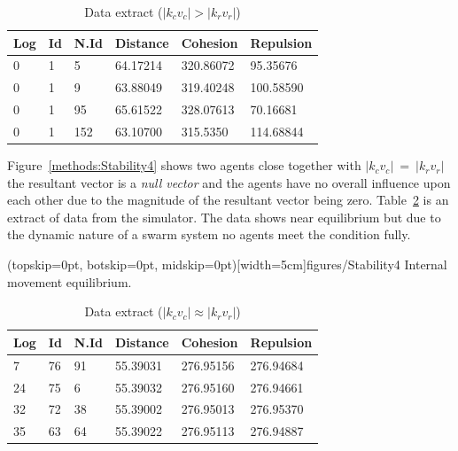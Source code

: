 \documentclass{ieeeaccess}
\begin{document}
\begin{table}[H]
\begin{center}
\begin{tabular}{| l | l | l | l | l | l |}
\hline
Log &	Id &	N.Id &	Distance &	{\color{green}Cohesion} & {\color{red}Repulsion} 	\\ \hline
0 & 1 & 5 &	64.17214 &	{\color{green}320.86072} &	{\color{red}95.35676} \\ \hline
0 & 1 & 9 &	63.88049 &	{\color{green}319.40248} &	{\color{red}100.58590} \\ \hline
0 & 1 & 95 & 65.61522 &	{\color{green}328.07613} &	{\color{red}70.16681} \\ \hline
0 & 1 & 152 & 63.10700 & {\color{green}315.5350} & {\color{red}114.68844} \\ 
\hline
\end{tabular}\caption{Data extract ($|k_cv_c| > |k_rv_r|$)} \label{tab:SampleCohesionPositive}
\end{center}
\end{table}

Figure~\ref{methods:Stability4} shows two agents close together with $|k_cv_c|~=~|k_rv_r|$ the resultant vector is a \emph{null vector} and the agents have no overall influence upon each other due to the magnitude of the resultant vector being zero. Table~\ref{tab:SampleEquilibrium} is an extract of data from the simulator. The data shows near equilibrium but due to the dynamic nature of a swarm system no agents meet the condition fully. 

\Figure[t!](topskip=0pt, botskip=0pt, midskip=0pt)[width=5cm]{figures/Stability4}
{Internal movement equilibrium.\label{methods:Stability4}}


\begin{table}[H]
\begin{center}
\begin{tabular}{| l | l | l | l | l | l |}
\hline
Log &	Id &	N.Id &	Distance &	{\color{green}Cohesion} &	{\color{red}Repulsion} 	\\ \hline
7 & 76 &	91 & 55.39031 & {\color{green}276.95156} & {\color{red}276.94684} \\ \hline
24 & 75 & 6 & 55.39032 & {\color{green}276.95160} & {\color{red}276.94661} \\ \hline
32 & 72 & 38 &	55.39002 & {\color{green}276.95013} & {\color{red}276.95370} \\ \hline
35 & 63 & 64 & 55.39022 &	{\color{green}276.95113} &	{\color{red}276.94887} \\
\hline
\end{tabular}\caption{Data extract ($|k_cv_c| \approx |k_rv_r|$)} \label{tab:SampleEquilibrium}
\end{center}
\end{table}
\end{document}
